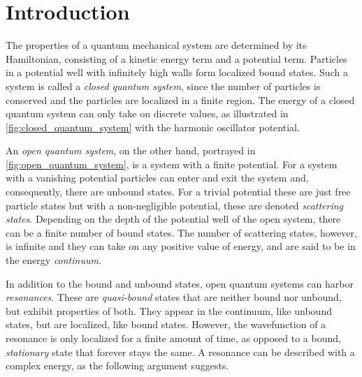 \documentclass[../main/report.tex]{subfiles}
\begin{document}
\chapter{Introduction}
\label{cha:introduction}

The properties of a quantum mechanical system are determined by its Hamiltonian, consisting of a kinetic energy term and a potential term.
Particles in a potential well with infinitely high walls form localized bound states.
Such a system is called a \emph{closed quantum system}, since the number of particles is conserved and the particles are localized in a finite region. 
The energy of a closed quantum system can only take on discrete values, as illustrated in \cref{fig:closed_quantum_system} with the harmonic oscillator potential.

An \emph{open quantum system}, on the other hand, portrayed in \cref{fig:open_quantum_system}, is a system with a finite potential.
For a system with a vanishing potential particles can enter and exit the system and, consequently, there are unbound states. 
For a trivial potential these are just free particle states but with a non-negligible potential, these are denoted \emph{scattering states}.
Depending on the depth of the potential well of the open system, there can be a finite number of bound states.
The number of scattering states, however, is infinite and they can take on any positive value of energy, and are said to be in the energy \emph{continuum}.

In addition to the bound and unbound states, open quantum systems can harbor \emph{resonances}. 
These are \emph{quasi-bound} states that are neither bound nor unbound, but exhibit properties of both. 
They appear in the continuum, like unbound states, but are localized, like bound states.
However, the wavefunction of a resonance is only localized for a finite amount of time, as opposed to a bound, \emph{stationary} state that forever stays the same.
A resonance can be described with a complex energy, as the following argument suggests.
\end{document}
